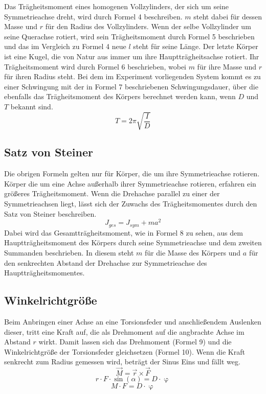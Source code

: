 \documentclass[titlepage = firstcover]{scrartcl}
\begin{document}
      Das Trägheitsmoment eines homogenen  Vollzylinders, der sich um seine Symmetrieachse dreht, wird durch Formel 4 beschreiben. $m$ steht dabei für dessen
      Masse und $r$ für den Radius des Vollzylinders. Wenn der selbe Vollzylinder um seine Querachse rotiert, wird sein Trägheitsmoment durch Formel 5 beschrieben 
      und das im Vergleich zu Formel 4 neue $l$ steht für seine Länge. Der letzte Körper ist eine Kugel, die von Natur aus immer um ihre Hauptträgheitsachse 
      rotiert. Ihr Trägheitsmoment wird durch Formel 6 beschrieben, wobei $m$ für ihre Masse und $r$ für ihren Radius steht. Bei dem im Experiment vorliegenden System
      kommt es zu einer Schwingung mit der in Formel 7 beschriebenen Schwingungsdauer, über die ebenfalls das Trägheitsmoment des Körpers berechnet werden kann, wenn
      $D$ und $T$ bekannt sind.
      \begin{equation}
        T = 2\pi \sqrt{\frac{I}{D}}
      \end{equation}

      \subsection{Satz von Steiner}
      Die obrigen Formeln gelten nur für Körper, die um ihre Symmetrieachse rotieren. Körper die um eine Achse außerhalb ihrer Symmetrieachse rotieren, erfahren
      ein größeres Trägheitsmoment. Wenn die Drehachse parallel zu einer der Symmetrieachsen liegt, lässt sich der Zuwachs des Trägheitsmomentes durch den Satz 
      von Steiner beschreiben. 
      \begin{equation}
        J_{ges} = J_{sym} + ma^2
      \end{equation}
      Dabei wird das Gesamtträgheitsmoment, wie in Formel 8 zu sehen, aus dem Hauptträgheitsmoment des Körpers durch seine Symmetrieachse und dem zweiten 
      Summanden beschrieben. In diesem steht $m$ für die Masse des Körpers und $a$ für den senkrechten Abstand der Drehachse zur Symmetrieachse des
      Hauptträgheitsmomentes.

      \subsection{Winkelrichtgröße}
      Beim Anbringen einer Achse an eine Torsionsfeder und anschließendem Auslenken dieser, tritt eine Kraft auf, die als Drehmoment auf die angbrachte Achse im Abstand $r$
      wirkt. Damit lassen sich das Drehmoment (Formel 9) und die Winkelrichtgröße der Torsionsfeder gleichsetzen (Formel 10). Wenn die Kraft senkrecht zum Radius gemessen wird,
      beträgt der Sinus Eins und fällt weg.
      \begin{equation}
        \vec{M} = \vec{r} \times \vec{F}
      \end{equation}
      \begin{equation}
        r \cdot F \cdot \sin(\alpha) = D \cdot \upvarphi
      \end{equation}
      \begin{equation*}
        M \cdot F = D \cdot \upvarphi
      \end{equation*} 
\end{document}
